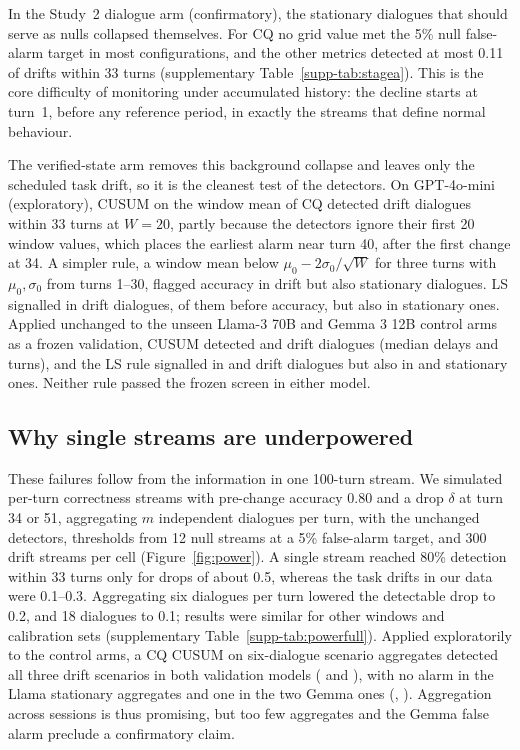 In the Study~2 dialogue arm (confirmatory), the stationary dialogues that should
serve as nulls collapsed themselves. For CQ no grid value met the 5\% null
false-alarm target in most configurations, and the other metrics detected at
most 0.11 of drifts within 33 turns (supplementary
Table~\ref{supp-tab:stagea}). This is the core difficulty of monitoring under
accumulated history: the decline starts at turn~1, before any reference period,
in exactly the streams that define normal behaviour.

The verified-state arm removes this background collapse and leaves only the
scheduled task drift, so it is the cleanest test of the detectors. On
GPT-4o-mini (exploratory), CUSUM on the window mean of CQ detected
\ctrlScreenDetect{} drift dialogues within 33 turns at $W=20$, partly because
the detectors ignore their first 20 window values, which places the earliest
alarm near turn 40, after the first change at 34. A simpler rule, a window mean
below $\mu_0-2\sigma_0/\sqrt{W}$ for three turns with $\mu_0,\sigma_0$ from turns
1--30, flagged accuracy in \earlyCqSignal{} drift but also \earlyCqNull{}
stationary dialogues. LS signalled in \earlyLsSignal{} drift dialogues,
\earlyLsBefore{} of them before accuracy, but also in \earlyLsNull{} stationary
ones. Applied unchanged to the unseen Llama-3 70B and Gemma 3 12B control arms
as a frozen validation, CUSUM detected \valLlamaDetect{} and \valGemmaDetect{}
drift dialogues (median delays \valLlamaDelay{} and \valGemmaDelay{} turns),
and the LS rule signalled in \valLlamaLsSignal{} and \valGemmaLsSignal{} drift
dialogues but also in \valLlamaLsNull{} and \valGemmaLsNull{} stationary ones.
Neither rule passed the frozen screen in either model.

\subsection{Why single streams are underpowered}

These failures follow from the information in one 100-turn stream. We
simulated per-turn correctness streams with pre-change accuracy 0.80 and a drop
$\delta$ at turn 34 or 51, aggregating $m$ independent dialogues per turn, with
the unchanged detectors, thresholds from 12 null streams at a 5\% false-alarm
target, and 300 drift streams per cell (Figure~\ref{fig:power}). A single
stream reached 80\% detection within 33 turns only for drops of about 0.5,
whereas the task drifts in our data were 0.1--0.3. Aggregating six dialogues
per turn lowered the detectable drop to 0.2, and 18 dialogues to 0.1; results
were similar for other windows and calibration sets (supplementary
Table~\ref{supp-tab:powerfull}). Applied exploratorily to the control arms, a
CQ CUSUM on six-dialogue scenario aggregates detected all three drift
scenarios in both validation models (\valLlamaAggDetect{} and
\valGemmaAggDetect{}), with no alarm in the Llama stationary aggregates and one
in the two Gemma ones (\valLlamaAggNull{}, \valGemmaAggNull{}). Aggregation
across sessions is thus promising, but too few aggregates and the Gemma false
alarm preclude a confirmatory claim.

